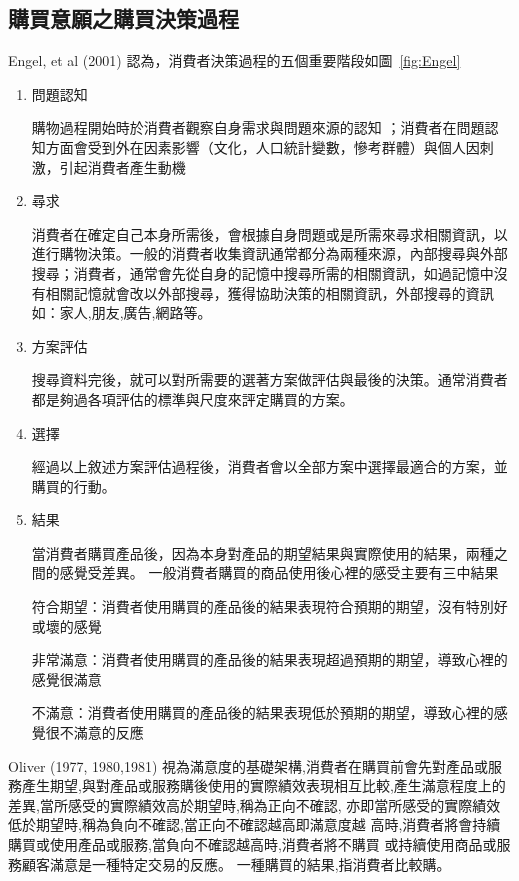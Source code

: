 \subsection{購買意願之購買決策過程}
Engel, et al (2001) 認為，消費者決策過程的五個重要階段如圖~\ref{fig:Engel}
\begin{enumerate}
\item 問題認知

購物過程開始時於消費者觀察自身需求與問題來源的認知 ；消費者在問題認知方面會受到外在因素影響（文化，人口統計變數，慘考群體）與個人因刺激，引起消費者產生動機

\item 尋求

消費者在確定自己本身所需後，會根據自身問題或是所需來尋求相關資訊，以進行購物決策。一般的消費者收集資訊通常都分為兩種來源，內部搜尋與外部搜尋；消費者，通常會先從自身的記憶中搜尋所需的相關資訊，如過記憶中沒有相關記憶就會改以外部搜尋，獲得協助決策的相關資訊，外部搜尋的資訊如：家人,朋友,廣告,網路等。
           
\item 方案評估

搜尋資料完後，就可以對所需要的選著方案做評估與最後的決策。通常消費者都是夠過各項評估的標準與尺度來評定購買的方案。

\item 選擇

經過以上敘述方案評估過程後，消費者會以全部方案中選擇最適合的方案，並購買的行動。

\item 結果 

當消費者購買產品後，因為本身對產品的期望結果與實際使用的結果，兩種之間的感覺受差異。
一般消費者購買的商品使用後心裡的感受主要有三中結果

符合期望：消費者使用購買的產品後的結果表現符合預期的期望，沒有特別好或壞的感覺

非常滿意：消費者使用購買的產品後的結果表現超過預期的期望，導致心裡的感覺很滿意

不滿意：消費者使用購買的產品後的結果表現低於預期的期望，導致心裡的感覺很不滿意的反應
\end{enumerate}

Oliver (1977, 1980,1981) \cite{Oliver1980}視為滿意度的基礎架構,消費者在購買前會先對產品或服務產生期望,與對產品或服務購後使用的實際績效表現相互比較,產生滿意程度上的差異,當所感受的實際績效高於期望時,稱為正向不確認, 亦即當所感受的實際績效低於期望時,稱為負向不確認,當正向不確認越高即滿意度越 高時,消費者將會持續購買或使用產品或服務,當負向不確認越高時,消費者將不購買 或持續使用商品或服務顧客滿意是一種特定交易的反應。 一種購買的結果,指消費者比較購。

